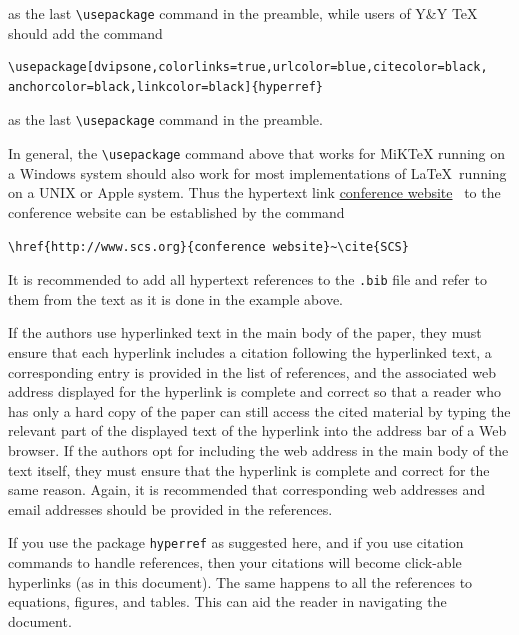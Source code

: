 \documentclass{scspaperproc}
\theoremstyle{scsthe}
\begin{document}
    as the last \verb+\usepackage+ command in the preamble, while users of Y\&Y TeX should add the command

    \begin{verbatim}
\usepackage[dvipsone,colorlinks=true,urlcolor=blue,citecolor=black,
anchorcolor=black,linkcolor=black]{hyperref}
    \end{verbatim}

    as the last \verb+\usepackage+ command in the preamble.

    In general, the \verb+\usepackage+ command above that works for MiKTeX running on a Windows system should also work for most implementations of \LaTeX\ running on a UNIX or Apple system.
    Thus the hypertext link \href{http://www.scs.org}{conference website}~\cite{SCS} to the conference website can be established by the command

    \begin{verbatim}
\href{http://www.scs.org}{conference website}~\cite{SCS}
    \end{verbatim}

    It is recommended to add all hypertext references to the \texttt{.bib} file and refer to them from the text as it is done in the example above.

    If the authors use hyperlinked text in the main body of the paper, they must ensure that each hyperlink includes a citation following the hyperlinked text, a corresponding entry is provided in the list of references, and the associated web address displayed for the hyperlink is complete and correct so that a reader who has only a hard copy of the paper can still access the cited material by typing the relevant part of the displayed text of the hyperlink into the address bar of a Web browser. If the authors opt for including the web address in the main body of the text itself, they must ensure that the hyperlink is complete and correct for the same reason. Again, it is recommended that corresponding web addresses and email addresses should be provided in the references.

    If you use the package \texttt{hyperref} as suggested here, and if you use citation commands to handle references, then your citations will
    become click-able hyperlinks (as in this document). The same happens to all the references to equations, figures, and tables. This can aid the reader in navigating the document.
\end{document}

